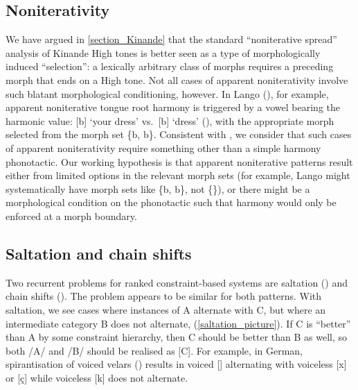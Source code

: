 \subsection{Noniterativity}

We have argued in \textsection\ref{section_Kinande} that the standard ``noniterative spread'' analysis of Kinande High tones is better seen as a type of morphologically induced ``selection'': a lexically arbitrary class of morphs requires a preceding morph that ends on a High tone. Not all cases of apparent noniterativity involve such blatant morphological conditioning, however. In Lango  (\citealt{Woock+:1979, Noonan:1992}), for example, apparent noniterative tongue root harmony is triggered by a vowel bearing the harmonic value: [b] `your dress' vs.\  [b] `dress' (\citealt[22]{Woock+:1979}), with the appropriate morph selected from the morph set \{b, b\}. Consistent with \citet{Kaplan:2008}, we consider that such cases of apparent noniterativity require something other than  a simple harmony phonotactic. Our working hypothesis is that apparent noniterative patterns result either from limited options in the relevant morph sets (for example, Lango might systematically have morph sets like \{b, b\}, not \{\}), or there might be a morphological condition on the phonotactic such that harmony would only be enforced at a morph boundary.

\subsection{Saltation and chain shifts}

Two recurrent problems for ranked constraint-based systems are saltation (\citealt{Hayes+:2015}) and chain shifts (\citealt{Kirchner:1996}). The problem appears to be similar for both patterns. With saltation, we see cases where instances of A alternate with C, but where an intermediate category B does not alternate, (\ref{saltation_picture}). If C is ``better'' than A by some constraint hierarchy, then C should be better than B as well, so both /A/ and /B/ should be realised as [C]. For example, in German, spirantisation of voiced velars  (\citealt{Ito+:2003German}) results in voiced [] alternating with voiceless [x] or [\c{c}] while voiceless [k] does not alternate.



